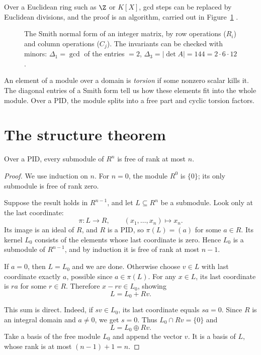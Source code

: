 Over a Euclidean ring such as $\Z$ or $K[X]$, gcd steps can be replaced by Euclidean divisions, and the proof is an algorithm, carried out in Figure~\ref{fig:smith} .

\begin{figure}[ht]
\centering
{}
\caption{The Smith normal form of an integer matrix, by row operations ($R_i$) and column operations ($C_j$). The invariants can be checked with minors: $\Delta_1=\gcd$ of the entries $=2$, $\Delta_3=|\det A|=144=2\cdot6\cdot12$.}
\label{fig:smith}
\end{figure}

An element of a module over a domain is \emph{torsion} if some nonzero
scalar kills it. The diagonal entries of a Smith form tell us how these
elements fit into the whole module. Over a PID, the module splits into a
free part and cyclic torsion factors.

\section{The structure theorem}

\begin{lemma}\label{lem:subfree}
Over a PID, every submodule of $R^n$ is free of rank at most $n$.
\end{lemma}
\begin{proof}
We use induction on $n$. For $n=0$,
the module $R^0$ is $\{0\}$; its only
submodule is free of rank zero.

Suppose the result holds in $R^{n-1}$,
and let $L\subseteq R^n$ be a submodule.
Look only at the last coordinate:
\[
\pi:L\longrightarrow R,\qquad
(x_1,\ldots,x_n)\longmapsto x_n.
\]
Its image is an ideal of $R$, and $R$
is a PID, so $\pi(L)=(a)$ for some $a\in R$.
Its kernel $L_0$ consists of the elements
whose last coordinate is zero. Hence
$L_0$ is a submodule of $R^{n-1}$,
and by induction it is free of rank
at most $n-1$.

If $a=0$, then $L=L_0$ and we are done.
Otherwise choose $v\in L$ with last
coordinate exactly $a$, possible
since $a\in\pi(L)$. For any $x\in L$,
its last coordinate is $ra$ for some
$r\in R$. Therefore $x-rv\in L_0$,
showing
\[
L=L_0+Rv.
\]

This sum is direct. Indeed, if $sv\in L_0$,
its last coordinate equals $sa=0$.
Since $R$ is an integral domain and
$a\ne0$, we get $s=0$. Thus
$L_0\cap Rv=\{0\}$ and
\[
L=L_0\oplus Rv.
\]
Take a basis of the free module $L_0$
and append the vector $v$.
It is a basis of $L$, whose rank is
at most $(n-1)+1=n$.
\end{proof}

